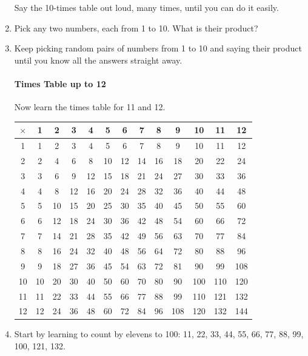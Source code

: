\documentclass[12pt]{article}
\begin{document}
\begin{enumerate}
Say the 10-times table out loud, many times, until you can do it easily.\\

\item Pick any two numbers, each  from 1 to 10. What is their product?
\item Keep picking random pairs of numbers from 1 to 10 and saying their product until you know all the answers straight away.

\pagebreak

\paragraph{Times Table up to 12}
Now learn the times table for 11 and 12.\\

\begin{center}
\begin{tabular}{|c||c|c|c|c|c|c|c|c|c|c|c|c|}
\hline
$\times$ & 1 & 2 & 3 & 4 & 5 & 6 & 7 & 8 & 9 & 10 & 11 & 12 \\
\hline\hline
1 & 1 & 2 & 3 & 4 & 5 & 6 & 7 & 8 & 9 & 10 & 11 & 12 \\
2 & 2 & 4 & 6 & 8 & 10 & 12 & 14 & 16 & 18 & 20 & 22 & 24 \\
3 & 3 & 6 & 9 & 12 & 15 & 18 & 21 & 24 & 27 & 30 & 33 & 36 \\
4 & 4 & 8 & 12 & 16 & 20 & 24 & 28 & 32 & 36 & 40 & 44 & 48 \\
5 & 5 & 10 & 15 & 20 & 25 & 30 & 35 & 40 & 45 & 50 & 55 & 60 \\
6 & 6 & 12 & 18 & 24 & 30 & 36 & 42 & 48 & 54 & 60 & 66 & 72 \\
7 & 7 & 14 & 21 & 28 & 35 & 42 & 49 & 56 & 63 & 70 & 77 & 84 \\
8 & 8 & 16 & 24 & 32 & 40 & 48 & 56 & 64 & 72 & 80 & 88 & 96 \\
9 & 9 & 18 & 27 & 36 & 45 & 54 & 63 & 72 & 81 & 90 & 99 & 108 \\
10 & 10 & 20 & 30 & 40 & 50 & 60 & 70 & 80 & 90 & 100 & 110 & 120 \\
11 & 11 & 22 & 33 & 44 & 55 & 66 & 77 & 88 & 99 & 110 & 121 & 132 \\
12 & 12 & 24 & 36 & 48 & 60 & 72 & 84 & 96 & 108 & 120 & 132 & 144 \\
\hline
\end{tabular}
\end{center}

\item Start by learning to count by elevens to 100:
11, 22, 33, 44, 55, 66, 77, 88, 99, 100, 121, 132.\\


\end{enumerate}
\end{document}
